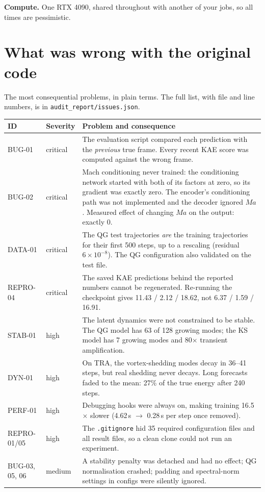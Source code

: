 \documentclass[10.5pt,a4paper]{article}
\begin{document}
\textbf{Compute.} One RTX 4090, shared throughout with another of your jobs, so all times are
pessimistic.

\section{What was wrong with the original code}\label{sec:audit}

The most consequential problems, in plain terms. The full list, with file and line numbers, is in
\texttt{audit\_report/\allowbreak issues.json}.

\begin{center}\small
\begin{tabularx}{\linewidth}{@{}l>{\raggedright}p{2.2cm}Y@{}}
\toprule
ID & Severity & Problem and consequence\\
\midrule
BUG-01 & critical & The evaluation script compared each prediction with the \emph{previous}
  true frame. Every recent KAE score was computed against the wrong frame.\\
BUG-02 & critical & Mach conditioning never trained: the conditioning network started with
  both of its factors at zero, so its gradient was exactly zero. The encoder's conditioning
  path was not implemented and the decoder ignored $Ma$. Measured effect of changing $Ma$ on
  the output: exactly 0.\\
DATA-01 & critical & The QG test trajectories \emph{are} the training trajectories for their
  first 500 steps, up to a rescaling (residual $6\times10^{-8}$). The QG configuration also
  validated on the test file.\\
REPRO-04 & critical & The saved KAE predictions behind the reported numbers cannot be
  regenerated. Re-running the checkpoint gives 11.43 / 2.12 / 18.62, not 6.37 / 1.59 / 16.91.\\
STAB-01 & high & The latent dynamics were not constrained to be stable. The QG model has 63 of
  128 growing modes; the KS model has 7 growing modes and 80$\times$ transient
  amplification.\\
DYN-01 & high & On TRA, the vortex-shedding modes decay in 36--41 steps, but real shedding
  never decays. Long forecasts faded to the mean: 27\% of the true energy after 240 steps.\\
PERF-01 & high & Debugging hooks were always on, making training 16.5$\times$ slower
  (4.62\,s $\to$ 0.28\,s per step once removed).\\
REPRO-01/05 & high & The \texttt{.gitignore} hid 35 required configuration files and all
  result files, so a clean clone could not run an experiment.\\
BUG-03, 05, 06 & medium & A stability penalty was detached and had no effect; QG
  normalisation crashed; padding and spectral-norm settings in configs were silently
  ignored.\\
\bottomrule
\end{tabularx}
\end{center}
\end{document}
